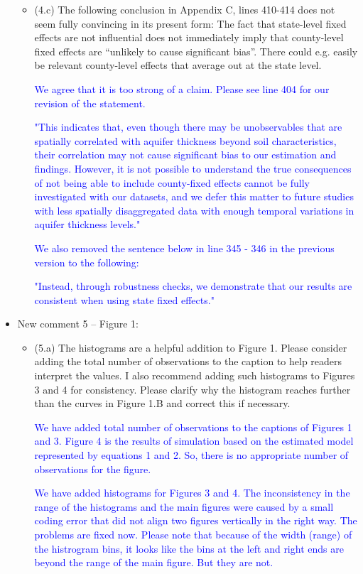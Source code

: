 \documentclass[
]{article}
\begin{document}
\begin{itemize}
\begin{itemize}
  \item (4.c) The following conclusion in Appendix C, lines 410-414 does not seem fully convincing in its present form: The fact that state-level fixed effects are not influential does not immediately imply that county-level fixed effects are ``unlikely to cause significant bias''. There could e.g. easily be relevant county-level effects that average out at the state level.

  \textcolor{blue}{We agree that it is too strong of a claim. Please see line 404 for our revision of the statement.}

  \textcolor{blue}{"This indicates that, even though there may be unobservables that are spatially correlated with aquifer thickness beyond soil characteristics, their correlation may not cause significant bias to our estimation and findings. However, it is not possible to understand the true consequences of not being able to include county-fixed effects cannot be fully investigated with our datasets, and we defer this matter to future studies with less spatially disaggregated data with enough temporal variations in aquifer thickness levels."}

  \textcolor{blue}{We also removed the sentence below in line 345 - 346 in the previous version to the following:}

  \textcolor{blue}{"Instead, through robustness checks, we demonstrate that our results are consistent when using state fixed effects."}

  \end{itemize}

\item New comment 5 – Figure 1:

  \begin{itemize}
   \item (5.a) The histograms are a helpful addition to Figure 1. Please consider adding the total number of observations to the caption to help readers interpret the values. I also recommend adding such histograms to Figures 3 and 4 for consistency. Please clarify why the histogram reaches further than the curves in Figure 1.B and correct this if necessary.

   \textcolor{blue}{We have added total number of observations to the captions of Figures 1 and 3. Figure 4 is the results of simulation based on the estimated model represented by equations 1 and 2. So, there is no appropriate number of observations for the figure.}

   \textcolor{blue}{We have added histograms for Figures 3 and 4. The inconsistency in the range of the histograms and the main figures were caused by a small coding error that did not align two figures vertically in the right way. The problems are fixed now. Please note that because of the width (range) of the histrogram bins, it looks like the bins at the left and right ends are beyond the range of the main figure. But they are not.}


\end{itemize}
\end{itemize}
\end{document}
